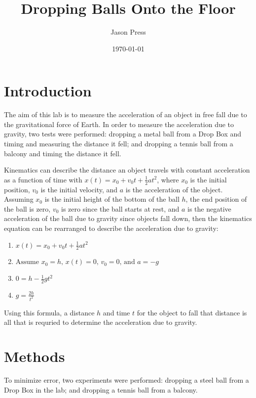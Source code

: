 \documentclass[12pt]{article}
\author{Jason Press}
\date{\today}
\title{Dropping Balls Onto the Floor}
\begin{document}
\maketitle
\begin{abstract}

\end{abstract}
\section{Introduction}
\label{sec:orgc815741}

The aim of this lab is to measure the acceleration of an object in free fall due to the gravitational force of Earth. In order to measure the acceleration due to gravity, two tests were performed: dropping a metal ball from a Drop Box and timing and measuring the distance it fell; and dropping a tennis ball from a balcony and timing the distance it fell.

Kinematics can describe the distance an object travels with constant acceleration as a function of time with \(x\left(t\right) = x_{0} + v_{0}t + \frac{1}{2}at^{2}\), where \(x_{0}\) is the initial position, \(v_{0}\) is the initial velocity, and \(a\) is the acceleration of the object. Assuming \(x_{0}\) is the initial height of the bottom of the ball \(h\), the end position of the ball is zero, \(v_{0}\) is zero since the ball starts at rest, and \(a\) is the negative acceleration of the ball due to gravity since objects fall down, then the kinematics equation can be rearranged to describe the acceleration due to gravity:

\begin{enumerate}
\item \(x(t) = x_{0} + v_{0}t + \frac{1}{2}at^{2} \)
\item \( \text{Assume } x_{0} = h \text{, } x(t) = 0 \text{, } v_{0} = 0 \text{, and } a = -g \)
\item \(0 = h - \frac{1}{2} gt^{2} \)
\item \(g = \frac{2h}{t^{2}} \)
\end{enumerate}

Using this formula, a distance \(h\) and time \(t\) for the object to fall that distance is all that is requried to determine the acceleration due to gravity.
\section{Methods}
\label{sec:org8f11065}

To minimize error, two experiments were performed: dropping a steel ball from a Drop Box in the lab; and dropping a tennis ball from a balcony.
\end{document}
